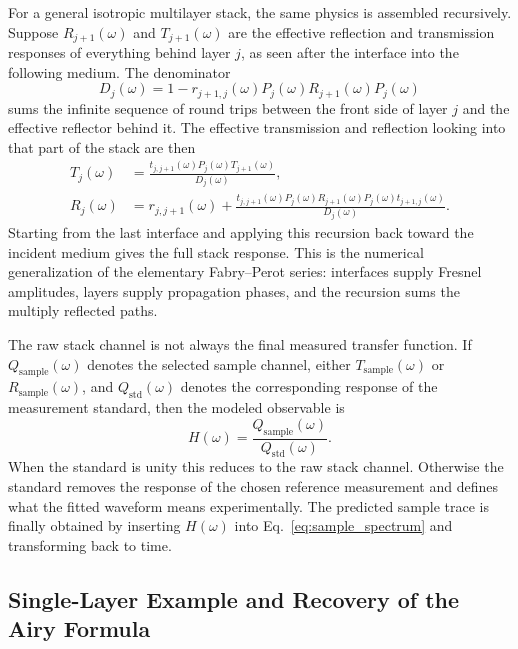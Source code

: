 \documentclass[11pt]{article}
\begin{document}
For a general isotropic multilayer stack, the same physics is assembled recursively. Suppose \(R_{j+1}(\omega)\) and \(T_{j+1}(\omega)\) are the effective reflection and transmission responses of everything behind layer \(j\), as seen after the interface into the following medium. The denominator
\begin{equation}
  D_j(\omega)
  =
  1-
  r_{j+1,j}(\omega)P_j(\omega)
  R_{j+1}(\omega)P_j(\omega)
  \label{eq:recursive_denominator}
\end{equation}
sums the infinite sequence of round trips between the front side of layer \(j\) and the effective reflector behind it. The effective transmission and reflection looking into that part of the stack are then
\begin{align}
  T_j(\omega)
  &=
  \frac{
    t_{j,j+1}(\omega)P_j(\omega)T_{j+1}(\omega)
  }{
    D_j(\omega)
  },
  \label{eq:recursive_transmission}
  \\
  R_j(\omega)
  &=
  r_{j,j+1}(\omega)
  +
  \frac{
    t_{j,j+1}(\omega)P_j(\omega)
    R_{j+1}(\omega)P_j(\omega)t_{j+1,j}(\omega)
  }{
    D_j(\omega)
  }.
  \label{eq:recursive_reflection}
\end{align}
Starting from the last interface and applying this recursion back toward the incident medium gives the full stack response. This is the numerical generalization of the elementary Fabry--Perot series: interfaces supply Fresnel amplitudes, layers supply propagation phases, and the recursion sums the multiply reflected paths.

The raw stack channel is not always the final measured transfer function. If \(Q_{\mathrm{sample}}(\omega)\) denotes the selected sample channel, either \(T_{\mathrm{sample}}(\omega)\) or \(R_{\mathrm{sample}}(\omega)\), and \(Q_{\mathrm{std}}(\omega)\) denotes the corresponding response of the measurement standard, then the modeled observable is
\begin{equation}
  H(\omega)
  =
  \frac{Q_{\mathrm{sample}}(\omega)}
       {Q_{\mathrm{std}}(\omega)} .
  \label{eq:standard_normalization}
\end{equation}
When the standard is unity this reduces to the raw stack channel. Otherwise the standard removes the response of the chosen reference measurement and defines what the fitted waveform means experimentally. The predicted sample trace is finally obtained by inserting \(H(\omega)\) into Eq.~\eqref{eq:sample_spectrum} and transforming back to time.

\subsection{Single-Layer Example and Recovery of the Airy Formula}
\end{document}
